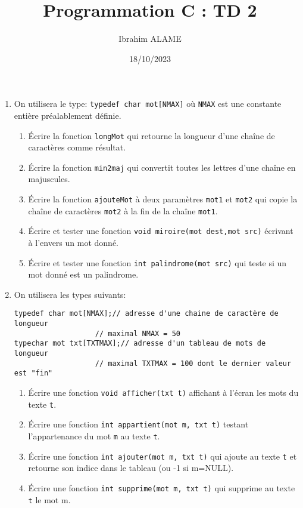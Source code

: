 \documentclass[a4paper]{article}
\title{Programmation C : TD 2}
\author{Ibrahim ALAME}
\date{18/10/2023}
\begin{document}
\maketitle

\begin{enumerate}
\item On utilisera le type: {\tt typedef char mot[NMAX]} où {\tt NMAX} est une constante entière préalablement  définie.
\begin{enumerate}
\item Écrire la fonction {\tt longMot} qui retourne la longueur d'une chaîne de caractères comme résultat. 
\item Écrire la fonction {\tt min2maj} qui convertit toutes les lettres d'une chaîne en majuscules.
\item Écrire la fonction {\tt ajouteMot} à deux paramètres {\tt mot1} et {\tt mot2} qui copie la chaîne de caractères {\tt mot2} à la fin de la chaîne {\tt mot1}.

\item Écrire et tester une fonction {\tt void  miroire(mot dest,mot src)} écrivant à l'envers un mot donné.

\item Écrire et tester une fonction {\tt int palindrome(mot src)} qui teste si un mot donné est un palindrome.

\end{enumerate}
\item On utilisera les types suivants:
\begin{verbatim}
typedef char mot[NMAX];// adresse d'une chaine de caractère de longueur
                   // maximal NMAX = 50
typechar mot txt[TXTMAX];// adresse d'un tableau de mots de longueur
                   // maximal TXTMAX = 100 dont le dernier valeur est "fin"                   
\end{verbatim}
\begin{enumerate}
\item Écrire une fonction {\tt void afficher(txt t)} affichant à l'écran les mots du texte {\tt t}.

\item Écrire une fonction {\tt int appartient(mot m, txt t)} testant l'appartenance du mot  {\tt m} au texte {\tt t}.
\item Écrire une fonction {\tt int ajouter(mot m, txt t)} qui ajoute au texte {\tt t} et retourne son indice dans le tableau (ou -1 si m=NULL).
\item Écrire une fonction {\tt int supprime(mot m, txt t)} qui supprime au texte {\tt t} le mot m.


\end{enumerate}
\end{enumerate}
\end{document}
